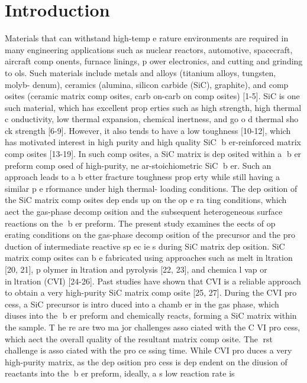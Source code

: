 \documentclass[10pt, letterpaper]{article}
\begin{document}
\noindent\hrulefill

\section{Introduction}
Materials that can withstand high-temp e rature environments are required in many engineering applications such as nuclear reactors, automotive, spacecraft, aircraft comp onents, furnace linings, p ower electronics,
and cutting and grinding to ols. Such materials include metals and alloys (titanium alloys, tungsten, molyb-
denum), ceramics (alumina, silicon carbide (SiC), graphite), and comp osites (ceramic matrix comp osites,
carb on-carb on comp osites) [1-5]. SiC is one such material, which has excellent prop erties such as high
strength, high thermal c onductivity, low thermal expansion, chemical inertness, and go o d thermal sho ck
strength [6-9]. However, it also tends to have a low toughness [10-12], which has motivated interest in high
purity and high quality SiC b er-reinforced matrix comp osites [13-19]. In such comp osites, a SiC matrix is
dep osited within a b er preform comp osed of high-purity, ne ar-stoichiometric SiC b er. Such an approach
leads to a b etter fracture toughness prop erty while still having a similar p e rformance under high thermal-
loading conditions. The dep osition of the SiC matrix comp osites dep ends up on the op e ra ting conditions,
which aect the gas-phase decomp osition and the subsequent heterogeneous surface reactions on the b er
preform. The present study examines the eects of op erating conditions on the gas-phase decomp osition of
the precursor and the pro duction of intermediate reactive sp ec ie s during SiC matrix dep osition.
SiC matrix comp osites can b e fabricated using approaches such as melt inltration [20, 21], p olymer
inltration and pyrolysis [22, 23], and chemica l vap or inltration (CVI) [24-26]. Past studies have shown
that CVI is a reliable approach to obtain a very high-purity SiC matrix comp osite [25, 27]. During the CVI
pro cess, a SiC precursor is intro duced into a chamb er in the gas phase, which diuses into the b er preform
and chemically reacts, forming a SiC matrix within the sample. T he re are two ma jor challenges asso ciated
with the C VI pro cess, which aect the overall quality of the resultant matrix comp osite. The rst challenge
is asso ciated with the pro ce ssing time. While CVI pro duces a very high-purity matrix, as the dep osition
pro cess is dep endent on the diusion of reactants into the b er preform, ideally, a s low reaction rate is
\end{document}
